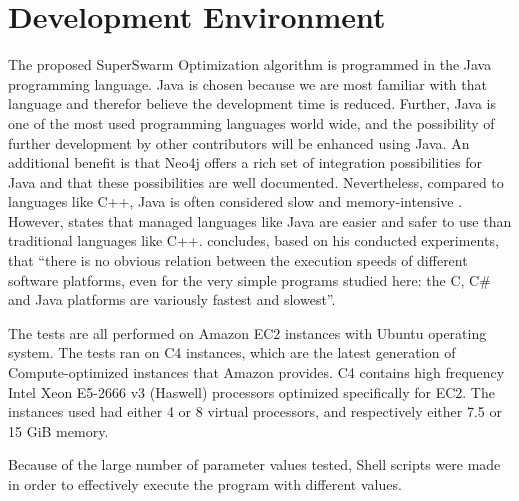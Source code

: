 \section{Development Environment}

The proposed SuperSwarm Optimization algorithm is programmed in the Java programming language. Java is chosen because we are most familiar with that language and therefor believe the development time is reduced. Further, Java is one of the most used programming languages world wide, and the possibility of further development by other contributors will be enhanced using Java. An additional benefit is that Neo4j offers a rich set of integration possibilities for Java and that these possibilities are well documented. Nevertheless, compared to languages like C++, Java is often considered slow and memory-intensive \citep{alnaser12}. However, \citet{sestoft10} states that managed languages like Java are easier and safer to use than traditional languages like C++. \citet{sestoft10} concludes, based on his conducted experiments, that ``there is no obvious relation between the execution speeds of different software platforms, even for the very simple programs studied here: the C, C\# and Java platforms are variously fastest and slowest''. 

The tests are all performed on Amazon EC2 instances with Ubuntu operating system. The tests ran on C4 instances, which are the latest generation of Compute-optimized instances that Amazon provides. C4 contains high frequency Intel Xeon E5-2666 v3 (Haswell) processors optimized specifically for EC2. The instances used had either 4 or 8 virtual processors, and respectively either 7.5 or 15 GiB memory. 

Because of the large number of parameter values tested, Shell scripts were made in order to effectively execute the program with different values. 




